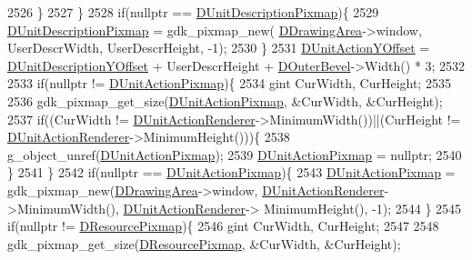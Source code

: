 \begin{DoxyCode}
{2526         \}
2527     \}
2528     \textcolor{keywordflow}{if}(\textcolor{keyword}{nullptr} == \hyperlink{classCApplicationData_a52e5c1a2ac452c82580ba3f4978c3501}{DUnitDescriptionPixmap})\{
2529         \hyperlink{classCApplicationData_a52e5c1a2ac452c82580ba3f4978c3501}{DUnitDescriptionPixmap} = gdk\_pixmap\_new(
      \hyperlink{classCApplicationData_a4735f5d31632313e0b2a1659eb178987}{DDrawingArea}->window, UserDescrWidth, UserDescrHeight, -1);
2530     \}
2531     \hyperlink{classCApplicationData_a8ccfb55bd25cba0e6eb66573ba9c8b3c}{DUnitActionYOffset} = \hyperlink{classCApplicationData_a6c60b2da482699f1d998acfe24fec332}{DUnitDescriptionYOffset} + UserDescrHeight
       + \hyperlink{classCApplicationData_abc2b04aa05148da81145ff6d6bc2bf01}{DOuterBevel}->Width() * 3;
2532     
2533     \textcolor{keywordflow}{if}(\textcolor{keyword}{nullptr} != \hyperlink{classCApplicationData_ae264356c833cd581093e3b373cce6620}{DUnitActionPixmap})\{
2534         gint CurWidth, CurHeight;
2535         
2536         gdk\_pixmap\_get\_size(\hyperlink{classCApplicationData_ae264356c833cd581093e3b373cce6620}{DUnitActionPixmap}, &CurWidth, &CurHeight);
2537         \textcolor{keywordflow}{if}((CurWidth != \hyperlink{classCApplicationData_a5aca1f832dd6387662f0d4441745cf6f}{DUnitActionRenderer}->MinimumWidth())||(CurHeight != 
      \hyperlink{classCApplicationData_a5aca1f832dd6387662f0d4441745cf6f}{DUnitActionRenderer}->MinimumHeight()))\{
2538             g\_object\_unref(\hyperlink{classCApplicationData_ae264356c833cd581093e3b373cce6620}{DUnitActionPixmap});
2539             \hyperlink{classCApplicationData_ae264356c833cd581093e3b373cce6620}{DUnitActionPixmap} = \textcolor{keyword}{nullptr};
2540         \}
2541     \}
2542     \textcolor{keywordflow}{if}(\textcolor{keyword}{nullptr} == \hyperlink{classCApplicationData_ae264356c833cd581093e3b373cce6620}{DUnitActionPixmap})\{
2543         \hyperlink{classCApplicationData_ae264356c833cd581093e3b373cce6620}{DUnitActionPixmap} = gdk\_pixmap\_new(\hyperlink{classCApplicationData_a4735f5d31632313e0b2a1659eb178987}{DDrawingArea}->window, 
      \hyperlink{classCApplicationData_a5aca1f832dd6387662f0d4441745cf6f}{DUnitActionRenderer}->MinimumWidth(), \hyperlink{classCApplicationData_a5aca1f832dd6387662f0d4441745cf6f}{DUnitActionRenderer}->
      MinimumHeight(), -1);
2544     \}
2545     \textcolor{keywordflow}{if}(\textcolor{keyword}{nullptr} != \hyperlink{classCApplicationData_aa9faf270fb2d769855fa5d787a883a83}{DResourcePixmap})\{
2546         gint CurWidth, CurHeight;
2547         
2548         gdk\_pixmap\_get\_size(\hyperlink{classCApplicationData_aa9faf270fb2d769855fa5d787a883a83}{DResourcePixmap}, &CurWidth, &CurHeight); 
}
\end{DoxyCode}
